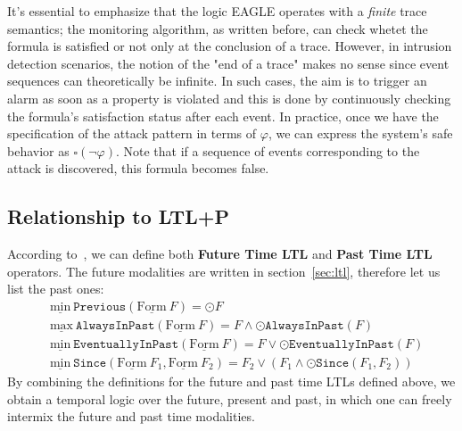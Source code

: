 \documentclass[english]{article}
\begin{document}
It's essential to emphasize that the logic EAGLE operates with a \textit{finite} trace semantics; the monitoring algorithm, as written before, can check whetet the formula is satisfied or not only at the conclusion of a trace. However, in intrusion detection scenarios, the notion of the "end of a trace" makes no sense since event sequences can theoretically be infinite. In such cases, the aim is to trigger an alarm as soon as a property is violated and this is done by continuously checking the formula's satisfaction status after each event. In practice, once we have the specification of the attack pattern in terms of $\varphi$, we can express the system's safe behavior as $\square(\neg \varphi)$. Note that if a sequence of events corresponding to the attack is discovered, this formula becomes false.

\subsection{Relationship to LTL+P}
According to~\cite{barringer2004rule,barringer2003eagle}, we can define both \textbf{Future Time LTL} and \textbf{Past Time LTL} operators. The future modalities are written in section~\ref{sec:ltl}, therefore let us list the past ones:
\begin{align*}
    & \underline{\text{min}}\ \mathtt{Previous}(\underline{\text{Form}}\ F) = \odot F \\
    & \underline{\text{max}}\ \mathtt{AlwaysInPast}(\underline{\text{Form}}\ F) = F \land \odot \mathtt{AlwaysInPast}(F) \\
    & \underline{\text{min}}\ \mathtt{EventuallyInPast}(\underline{\text{Form}}\ F) = F \lor \odot \mathtt{EventuallyInPast}(F) \\
    & \underline{\text{min}}\ \mathtt{Since}(\underline{\text{Form}}\ F_1, \underline{\text{Form}}\ F_2) = F_2 \lor (F_1 \land \odot \mathtt{Since}(F_1,F_2))
\end{align*}
By combining the definitions for the future and past time LTLs defined above, we obtain a temporal logic over the future, present and past, in which one can freely intermix the future and past time modalities. 
\end{document}

